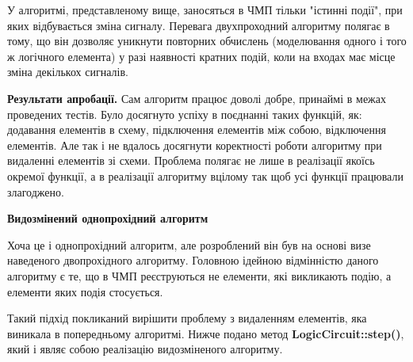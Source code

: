 \documentclass[12pt,a4paper]{article}
\begin{document}
У алгоритмі, представленому вище, заносяться в ЧМП тільки "істинні події", при яких відбувається зміна сигналу. Перевага двухпроходний алгоритму полягає в тому, що він дозволяє уникнути повторних обчислень (моделювання одного і того ж логічного елемента) у разі наявності кратних подій, коли на входах має місце зміна декількох сигналів.

\textbf{Результати апробації.} Сам алгоритм працює доволі добре, принаймі в межах проведених тестів. Було досягнуто успіху в поєднанні таких функцій, як: додавання елементів в схему, підключення елементів між собою, відключення елементів. Але так і не вдалось досягнути коректності роботи алгоритму при видаленні елементів зі схеми. Проблема полягає не лише в реалізації якоїсь окремої функції, а в реалізації алгоритму вцілому так щоб усі функції працювали злагоджено.


\textbf{Видозмінений однопрохідний алгоритм}

Хоча це і однопрохідний алгоритм, але розроблений він був на основі визе наведеного двопрохідного алгоритму. Головною ідейною відмінністю даного алгоритму є те, що в ЧМП реєструються не елементи, які викликають подію, а елементи яких подія стосується.

Такий підхід покликаний вирішити проблему з видаленням елементів, яка виникала в попередньому алгоритмі. Нижче подано метод \textbf{LogicCircuit::step()}, який і являє собою реалізацію видозміненого алгоритму.
\end{document}
